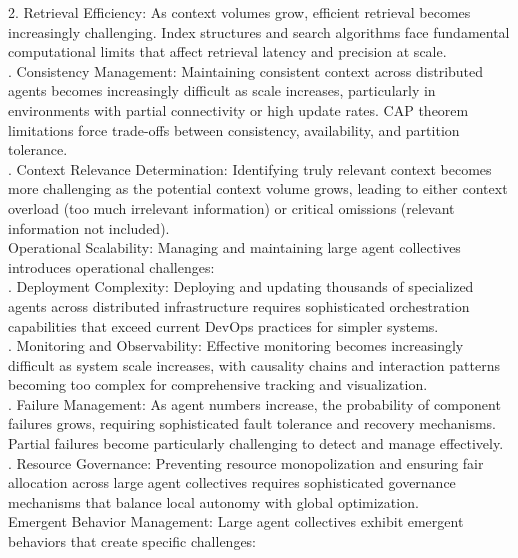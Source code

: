 2. Retrieval Efficiency: As context volumes grow, efficient retrieval becomes increasingly challenging. Index structures and search algorithms face fundamental computational limits that affect retrieval latency and precision at scale.\\ . Consistency Management: Maintaining consistent context across distributed agents becomes increasingly difficult as scale increases, particularly in environments with partial connectivity or high update rates. CAP theorem limitations force trade-offs between consistency, availability, and partition tolerance.\\ . Context Relevance Determination: Identifying truly relevant context becomes more challenging as the potential context volume grows, leading to either context overload (too much irrelevant information) or critical omissions (relevant information not included).\\ \newline
Operational Scalability: Managing and maintaining large agent collectives introduces operational challenges:\\ . Deployment Complexity: Deploying and updating thousands of specialized agents across distributed infrastructure requires sophisticated orchestration capabilities that exceed current DevOps practices for simpler systems.\\ . Monitoring and Observability: Effective monitoring becomes increasingly difficult as system scale increases, with causality chains and interaction patterns becoming too complex for comprehensive tracking and visualization.\\ . Failure Management: As agent numbers increase, the probability of component failures grows, requiring sophisticated fault tolerance and recovery mechanisms. Partial failures become particularly challenging to detect and manage effectively.\\ . Resource Governance: Preventing resource monopolization and ensuring fair allocation across large agent collectives requires sophisticated governance mechanisms that balance local autonomy with global optimization.\\ \newline
Emergent Behavior Management: Large agent collectives exhibit emergent behaviors that create specific challenges:\\ \newline
